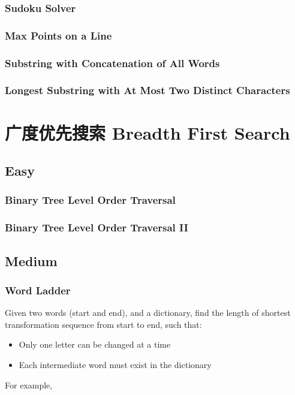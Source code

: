 \documentclass[11pt]{book}
\begin{document}
\subsection{Sudoku Solver}
\label{sec-6-3-4}
\subsection{Max Points on a Line}
\label{sec-6-3-5}
\subsection{Substring with Concatenation of All Words}
\label{sec-6-3-6}
\subsection{Longest Substring with At Most Two Distinct Characters}
\label{sec-6-3-7}
\chapter{广度优先搜索 Breadth First Search}
\label{sec-7}
\section{Easy}
\label{sec-7-1}
\subsection{Binary Tree Level Order Traversal}
\label{sec-7-1-1}
\subsection{Binary Tree Level Order Traversal II}
\label{sec-7-1-2}
\section{Medium}
\label{sec-7-2}
\subsection{Word Ladder}
\label{sec-7-2-1}
Given two words (start and end), and a dictionary, find the length of shortest transformation sequence from start to end, such that:
\begin{itemize}
\item Only one letter can be changed at a time
\item Each intermediate word must exist in the dictionary
\end{itemize}
For example,
\end{document}
